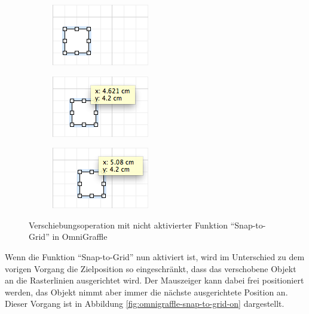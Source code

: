 \begin{figure}[hbt]
    \newcommand{\subfigurewidth}{0.33\textwidth}
    \newcommand{\graphicswidth}{0.95\linewidth}
    \begin{subfigure}{\subfigurewidth}
        \centering
        \includegraphics[width=\graphicswidth]{resources/omnigraffle-snap-to-grid-off-a}
        \caption{}
    \end{subfigure}
    \begin{subfigure}{\subfigurewidth}
        \centering
        \includegraphics[width=\graphicswidth]{resources/omnigraffle-snap-to-grid-off-b}
        \caption{}
    \end{subfigure}
    \begin{subfigure}{\subfigurewidth}
        \centering
        \includegraphics[width=\graphicswidth]{resources/omnigraffle-snap-to-grid-off-c}
        \caption{}
    \end{subfigure}
    \caption{Verschiebungsoperation mit nicht aktivierter Funktion \enquote{Snap-to-Grid} in OmniGraffle}
    \label{fig:omnigraffle-snap-to-grid-off}
\end{figure}

Wenn die Funktion \enquote{Snap-to-Grid} nun aktiviert ist, wird im Unterschied zu dem vorigen Vorgang die Zielposition so eingeschränkt, dass das verschobene Objekt an die Rasterlinien ausgerichtet wird. Der Mauszeiger kann dabei frei positioniert werden, das Objekt nimmt aber immer die nächste ausgerichtete Position an. Dieser Vorgang ist in Abbildung \ref{fig:omnigraffle-snap-to-grid-on} dargestellt.

